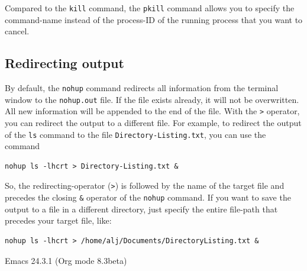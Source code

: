 \documentclass[11pt]{article}
\begin{document}
Compared to the \texttt{kill} command, the \texttt{pkill} command allows you to
specify the command-name instead of the process-ID of the running
process that you want to cancel.





\subsection{Redirecting output}
\label{sec-5-2}
By default, the \texttt{nohup} command redirects all information from the
terminal window to the \texttt{nohup.out} file. If the file exists already,
it will not be overwritten. All new information will be appended to
the end of the file. With the \texttt{>} operator, you can redirect the
output to a different file. For example, to redirect the output of the
\texttt{ls} command to the file \texttt{Directory-Listing.txt}, you can use the
command

\begin{verbatim}
nohup ls -lhcrt > Directory-Listing.txt &
\end{verbatim}

So, the redirecting-operator (\texttt{>}) is followed by the name of the
target file and precedes the closing \texttt{\&} operator of the \texttt{nohup}
command. If you want to save the output to a file in a different
directory, just specify the entire file-path that precedes your target
file, like:

\begin{verbatim}
nohup ls -lhcrt > /home/alj/Documents/DirectoryListing.txt &
\end{verbatim}
Emacs 24.3.1 (Org mode 8.3beta)
\end{document}
